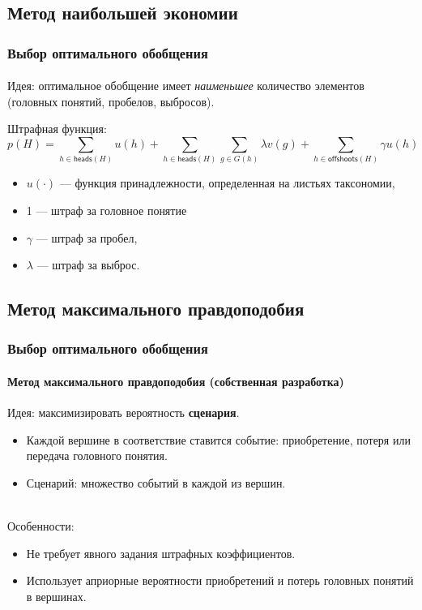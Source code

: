 \documentclass[aspectratio=169]{beamer}
\begin{document}
\subsection{Метод наибольшей экономии}
\begin{frame}
	\frametitle{Выбор оптимального обобщения}
	\framesubtitle{\insertsubsection}
	Идея: оптимальное обобщение имеет \emph{наименьшее} количество элементов (головных понятий, пробелов, выбросов).
	
	Штрафная функция:
	\begin{equation*}
	p(H)=\sum_{h\in \textsf{heads}(H)}u(h) + \sum_{h\in \textsf{heads}(H)}\sum_{g\in G(h)}\lambda v(g) + \sum_{h\in \textsf{offshoots}(H)}\gamma u(h)
	\label{eq:pars_criterion}
	\end{equation*}
	\begin{itemize}
		\item $u(\cdot)$ --- функция принадлежности, определенная на листьях таксономии,
		\item 1 --- штраф за головное понятие
		\item $\gamma$ --- штраф за пробел,
		\item $\lambda$ --- штраф за выброс.
	\end{itemize}
\end{frame}

\subsection{Метод максимального правдоподобия}

\begin{frame}
	\frametitle{Выбор оптимального обобщения}
	\framesubtitle{Метод максимального правдоподобия (собственная разработка)}
	Идея: максимизировать вероятность \textbf{сценария}.
	\begin{itemize}
		\item Каждой вершине в соответствие ставится событие: приобретение, потеря или передача головного понятия.
		\item Сценарий: множество событий в каждой из вершин.
	\end{itemize}
	~\\
	
	Особенности:
	\begin{itemize}
		\item Не требует явного задания штрафных коэффициентов.
		\item Использует априорные вероятности приобретений и потерь головных понятий в вершинах.
	\end{itemize}	
\end{frame}
\end{document}

